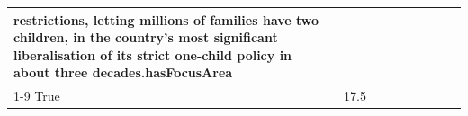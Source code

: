 \begin{table}[H]
\begin{tabular}{lllrlllll}
restrictions, letting millions of families have two children, in the country's most significant liberalisation of its strict one-child policy in about three decades.hasFocusArea \\
\cline{1-9}
True & 17.5%
\end{tabular}
\end{table}
